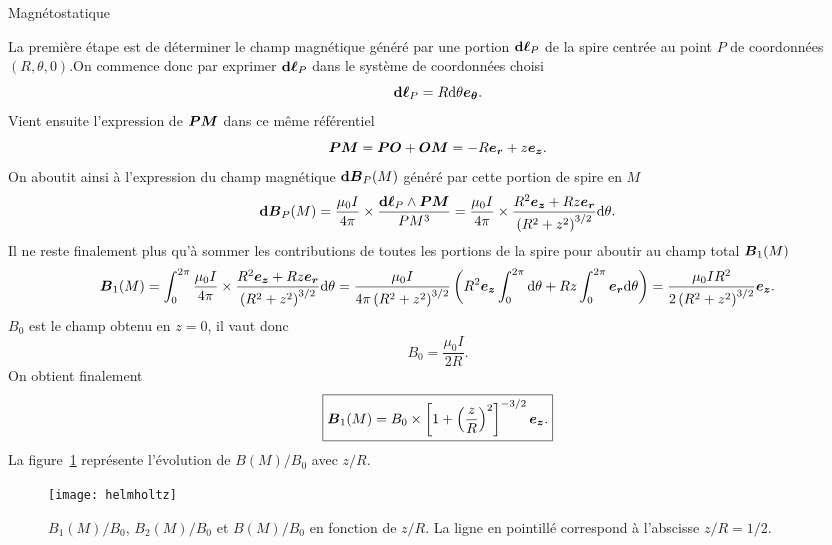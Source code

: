 \begin{corr}{Magnétostatique}
\begin{corrlist}
		\item La première étape est de déterminer le champ magnétique généré
		  par une portion $\dl_P$ de la spire centrée au point $P$
		  de coordonnées $(R, \theta, 0)$.On commence donc par exprimer $\dl_P$ 
		  dans le système de coordonnées choisi
		  \begin{equation*}
			  \dl_P = R \dtheta \etheta.
		  \end{equation*}
		  Vient ensuite l'expression de $\mitbf{PM}$ 
		  dans ce même référentiel
		  \begin{equation*}
			  \mitbf{PM} = \mitbf{PO} + \mitbf{OM} = -R \er + z\ez.
		  \end{equation*}
		  On aboutit ainsi à l'expression du champ magnétique $
		  \mathrm{\textbf{d}}\vecb_P(M)$
		  généré par cette portion de spire en $M$
		  \begin{equation*}
			  \mathrm{\textbf{d}}\vecb_P(M) = \dfrac{\mu_0 I}{4 \pi} \times 
			  \dfrac{\dl_P \wedge \mitbf{PM}}{PM^3}
			  = \dfrac{\mu_0 I}{4 \pi} \times \dfrac{R^2\ez + Rz\er}
			  {\left(R^2 + z^2\right)^{3/2}} \dtheta.
		  \end{equation*}
		  Il ne reste finalement plus qu'à sommer les contributions 
		  de toutes les portions de la spire pour aboutir au champ total
		  $\vecb_1(M)$
		  \begin{equation*}
			  \vecb_1(M) = \int_0^{2\pi} \dfrac{\mu_0 I}{4 \pi} \times 
			  \dfrac{R^2\ez + Rz\er}
			  {\left(R^2 + z^2\right)^{3/2}} \dtheta
			  = \dfrac{\mu_0 I}{4 \pi\left(R^2 + z^2\right)^{3/2}} 
			  \left(
		            R^2\ez  
		    \int_0^{2\pi}\dtheta + Rz \int_0^{2\pi} \er \dtheta
		     \right)
		     = \dfrac{\mu_0 I R^2}{2 \left(R^2 + z^2\right)^{3/2}}\ez.
		  \end{equation*}
		  $B_0$ est le champ obtenu en $z = 0$, il vaut donc
		  \begin{equation*}
			  B_0 = \dfrac{\mu_0 I}{2 R}.
		  \end{equation*}
		  On obtient finalement
		  \begin{equation*}
			  \boxed{\vecb_1(M) = B_0 \times 
			  \left[1 + \left(\dfrac{z}{R}\right)^2\right]^{-3/2}\ez.}
		  \end{equation*}
		  La figure~\ref{fig:helmholtz} représente l'évolution de 
		  $B(M)/B_0$ avec $z/R$.
		  \begin{figure}[htpb]
		  	\centering
			\texttt{[image: helmholtz]}
			\caption{$B_1(M)/B_0$, $B_2(M)/B_0$ et $B(M)/B_0$ 
			         en fonction de $z/R$. La ligne en pointillé correspond
			 à l'abscisse $z/R = 1/2$.}%
			\label{fig:helmholtz}
		  \end{figure}


\end{corrlist}
\end{corr}
